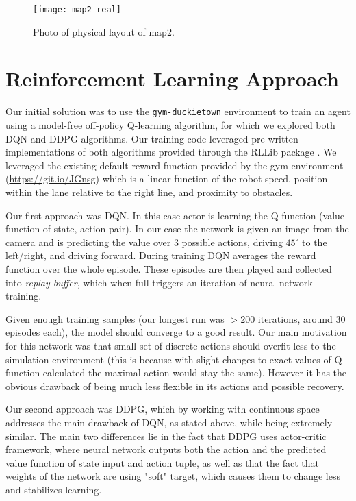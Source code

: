 \documentclass{article}
\begin{document}
\begin{figure}[H]
\texttt{[image: map2\_real]}
\centering
\caption{Photo of physical layout of map2.}
\label{fig:map2_real}
\end{figure}

\section{Reinforcement Learning Approach}

Our initial solution was to use the \texttt{gym-duckietown} environment to train an agent using a model-free off-policy Q-learning algorithm, for which we explored both DQN \cite{DBLP:journals/corr/MnihKSGAWR13} and DDPG \cite{journals/corr/LillicrapHPHETS15} algorithms. Our training code leveraged pre-written implementations of both algorithms provided through the RLLib package \cite{DBLP:journals/corr/abs-1712-09381}. We leveraged the existing default reward function provided by the gym environment (\url{https://git.io/JGnsg}) which is a linear function of the robot speed, position within the lane relative to the right line, and proximity to obstacles.

Our first approach was DQN. In this case actor is learning the Q function (value function of state, action pair). In our case the network is given an image from the camera and is predicting the value over 3 possible actions, driving $45^\circ$ to the left/right, and driving forward. During training DQN averages the reward function over the whole episode. These episodes are then played and collected into \textit{replay buffer}, which when full triggers an iteration of neural network training.

Given enough training samples (our longest run was $>200$ iterations, around 30 episodes each), the model should converge to a good result. Our main motivation for this network was that small set of discrete actions should overfit less to the simulation environment (this is because with slight changes to exact values of Q function calculated the maximal action would stay the same). However it has the obvious drawback of being much less flexible in its actions and possible recovery.

Our second approach was DDPG, which by working with continuous space addresses the main drawback of DQN, as stated above, while being extremely similar. The main two differences lie in the fact that DDPG uses actor-critic framework, where neural network outputs both the action and the predicted value function of state input and action tuple, as well as that the fact that weights of the network are using "soft" target, which causes them to change less and stabilizes learning.
\end{document}
